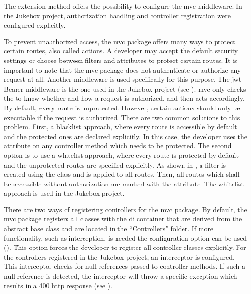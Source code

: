 
The  extension method offers the possibility to configure the \gls{mvc} middleware. In the Jukebox project, authorization handling and controller registration were configured explicitly.

To prevent unauthorized access, the \gls{mvc} package offers many ways to protect certain routes, also called actions. A developer may accept the default security settings or choose between filters and attributes to protect certain routes. It is important to note that the \gls{mvc} package does not authenticate or authorize any request at all. Another middleware is used specifically for this purpose. The \gls{jwt} Bearer middleware is the one used in the Jukebox project (see ). \gls{mvc} only checks the  to know whether and how a request is authorized, and then acts accordingly. By default, every route is unprotected. However, certain actions should only be executable if the request is authorized. There are two common solutions to this problem. First, a blacklist approach, where every route is accessible by default and the protected ones are declared explicitly. In this case, the developer uses the \lstcode{[Authorize]} attribute on any controller method which needs to be protected. The second option is to use a whitelist approach, where every route is protected by default and the unprotected routes are specified explicitly. As shown in , a filter is created using the  class and is applied to all routes. Then, all routes which shall be accessible without authorization are marked with the \lstcode{[AllowAnonymous]} attribute. The whitelist approach is used in the Jukebox project.

 \newpage

There are two ways of registering controllers for the \gls{mvc} package. By default, the \gls{mvc} package registers all classes with the \gls{di} container that are derived from the abstract  base class and are located in the \enquote{Controllers} folder. If more functionality, such as interception, is needed the  configuration option can be used (). This option forces the developer to register all controller classes explicitly. For the controllers registered in the Jukebox project, an interceptor is configured. This interceptor checks for null references passed to controller methods. If such a null reference is detected, the interceptor will throw a specific exception which results in a 400 \gls{http} response (see ).

